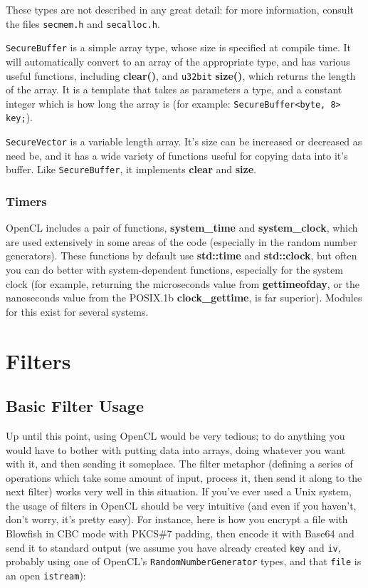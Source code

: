 \documentclass{article}
\newcommand{\filename}[1]{\texttt{#1}}
\newcommand{\function}[1]{\textbf{#1}}
\newcommand{\type}[1]{\texttt{#1}}
\begin{document}
These types are not described in any great detail: for more information,
consult the files \filename{secmem.h} and \filename{secalloc.h}.

\type{SecureBuffer} is a simple array type, whose size is specified at compile
time. It will automatically convert to an array of the appropriate type, and
has various useful functions, including \function{clear()}, and \type{u32bit}
\function{size()}, which returns the length of the array. It is a template that
takes as parameters a type, and a constant integer which is how long the array
is (for example: \verb|SecureBuffer<byte, 8> key;|).

\type{SecureVector} is a variable length array. It's size can be increased or
decreased as need be, and it has a wide variety of functions useful for copying
data into it's buffer. Like \type{SecureBuffer}, it implements \function{clear}
and \function{size}.

\subsubsection{Timers}

OpenCL includes a pair of functions, \function{system\_time} and
\function{system\_clock}, which are used extensively in some areas of the code
(especially in the random number generators). These functions by default use
\function{std::time} and \function{std::clock}, but often you can do better
with system-dependent functions, especially for the system clock (for example,
returning the microseconds value from \function{gettimeofday}, or the
nanoseconds value from the POSIX.1b \function{clock\_gettime}, is far
superior). Modules for this exist for several systems.

\pagebreak

\section{Filters}

\subsection{Basic Filter Usage}

Up until this point, using OpenCL would be very tedious; to do anything you
would have to bother with putting data into arrays, doing whatever you want
with it, and then sending it someplace. The filter metaphor (defining a series
of operations which take some amount of input, process it, then send it along
to the next filter) works very well in this situation. If you've ever used a
Unix system, the usage of filters in OpenCL should be very intuitive (and even
if you haven't, don't worry, it's pretty easy). For instance, here is how you
encrypt a file with Blowfish in CBC mode with PKCS\#7 padding, then encode it
with Base64 and send it to standard output (we assume you have already created
\verb|key| and \verb|iv|, probably using one of OpenCL's
\type{RandomNumberGenerator} types, and that \verb|file| is an open
\type{istream}):
\end{document}
